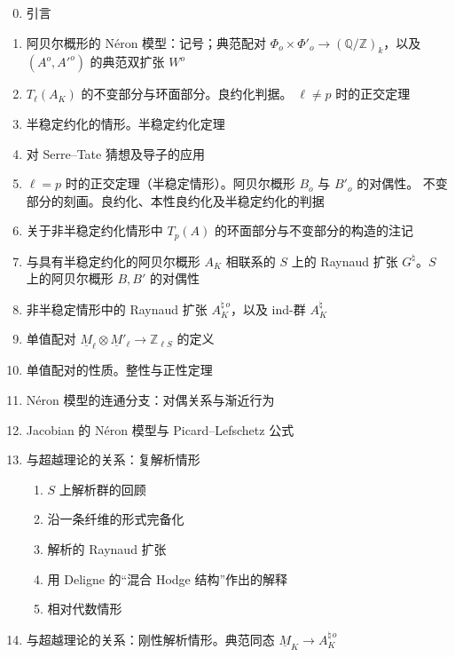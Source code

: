 \begin{enumerate}[label=\arabic*.]
\setcounter{enumi}{-1}
\item 引言
\item 阿贝尔概形的 N\'eron 模型：记号；典范配对
  $\Phi_o\times\Phi'_o\longrightarrow(\mathbb Q/\mathbb Z)_k$，以及
  $(A^o,{A'}^o)$ 的典范双扩张 $W^o$
\item $T_\ell(A_K)$ 的不变部分与环面部分。良约化判据。
  $\ell\ne p$ 时的正交定理
\item 半稳定约化的情形。半稳定约化定理
\item 对 Serre--Tate 猜想及导子的应用
\item $\ell=p$ 时的正交定理（半稳定情形）。阿贝尔概形 $B_o$ 与 $B'_o$ 的对偶性。
  不变部分的刻画。良约化、本性良约化及半稳定约化的判据
\item 关于非半稳定约化情形中 $T_p(A)$ 的环面部分与不变部分的构造的注记
\item 与具有半稳定约化的阿贝尔概形 $A_K$ 相联系的 $S$ 上的 Raynaud 扩张
  $G^\natural$。$S$ 上的阿贝尔概形 $B,B'$ 的对偶性
\item 非半稳定情形中的 Raynaud 扩张 $A_K^{\natural\,o}$，以及 ind-群 $A_K^\natural$
\item 单值配对
  $\underline M_\ell\otimes\underline M'_\ell\longrightarrow
  \mathbb Z_{\ell S}$ 的定义
\item 单值配对的性质。整性与正性定理
\item N\'eron 模型的连通分支：对偶关系与渐近行为
\item Jacobian 的 N\'eron 模型与 Picard--Lefschetz 公式
\item 与超越理论的关系：复解析情形
  \begin{enumerate}[label=\arabic{enumi}.\arabic*.]
  \item $S$ 上解析群的回顾
  \item 沿一条纤维的形式完备化
  \item 解析的 Raynaud 扩张
  \item 用 Deligne 的“混合 Hodge 结构”作出的解释
  \item 相对代数情形
  \end{enumerate}
\item 与超越理论的关系：刚性解析情形。典范同态
  $\underline M_K\longrightarrow A_K^{\natural\,o}$
\end{enumerate}




